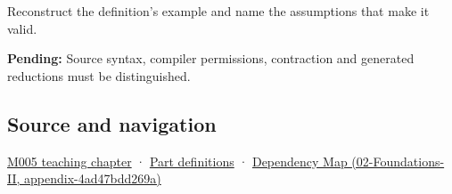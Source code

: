 Reconstruct the definition's example and name the assumptions that make it valid.

\textbf{Pending:} Source syntax, compiler permissions, contraction and generated reductions must be distinguished.

\subsection{Source and navigation}\label{appendix-c2ac4a84c283-source-and-navigation}

\hyperref[01-foundations-i-ch001-when-arithmetic-meets-uncertainty]{M005 teaching chapter} · \hyperref[appendix-fd090d982a15-m005---parts-77-88]{Part definitions} · \href{../02-Foundations-II/main.pdf\#nameddest=appendix-4ad47bdd269a}{Dependency Map (02-Foundations-II, appendix-4ad47bdd269a)}

